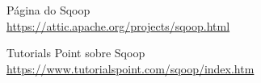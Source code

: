 \documentclass[a4paper,11pt]{article}
\begin{document}


\begin{thebibliography}{4}
	Página do Sqoop \\
	\url{https://attic.apache.org/projects/sqoop.html}

	Tutorials Point sobre Sqoop \\
	\url{https://www.tutorialspoint.com/sqoop/index.htm}
	
	
\end{thebibliography}
\end{document}
